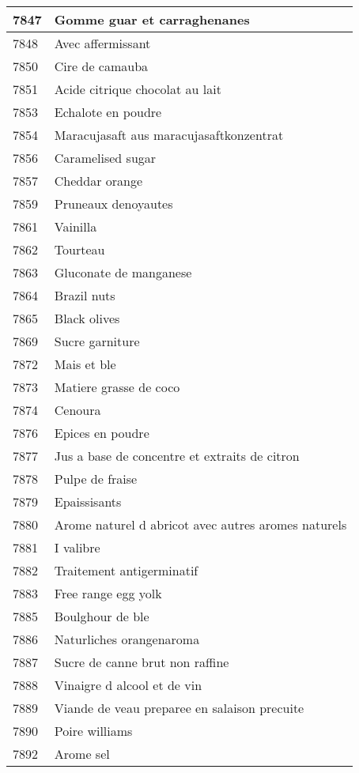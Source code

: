 \begin{longtable}{|l|l|}
7847 & Gomme guar et carraghenanes \\ \hline 
7848 & Avec affermissant \\ \hline 
7850 & Cire de camauba \\ \hline 
7851 & Acide citrique chocolat au lait \\ \hline 
7853 & Echalote en poudre \\ \hline 
7854 & Maracujasaft aus maracujasaftkonzentrat \\ \hline 
7856 & Caramelised sugar \\ \hline 
7857 & Cheddar orange \\ \hline 
7859 & Pruneaux denoyautes \\ \hline 
7861 & Vainilla \\ \hline 
7862 & Tourteau \\ \hline 
7863 & Gluconate de manganese \\ \hline 
7864 & Brazil nuts \\ \hline 
7865 & Black olives \\ \hline 
7869 & Sucre garniture \\ \hline 
7872 & Mais et ble \\ \hline 
7873 & Matiere grasse de coco \\ \hline 
7874 & Cenoura \\ \hline 
7876 & Epices en poudre \\ \hline 
7877 & Jus a base de concentre et extraits de citron \\ \hline 
7878 & Pulpe de fraise \\ \hline 
7879 & Epaissisants \\ \hline 
7880 & Arome naturel d abricot avec autres aromes naturels \\ \hline 
7881 & I valibre \\ \hline 
7882 & Traitement antigerminatif \\ \hline 
7883 & Free range egg yolk \\ \hline 
7885 & Boulghour de ble \\ \hline 
7886 & Naturliches orangenaroma \\ \hline 
7887 & Sucre de canne brut non raffine \\ \hline 
7888 & Vinaigre d alcool et de vin \\ \hline 
7889 & Viande de veau preparee en salaison precuite \\ \hline 
7890 & Poire williams \\ \hline 
7892 & Arome sel \\ \hline 

\end{longtable}
